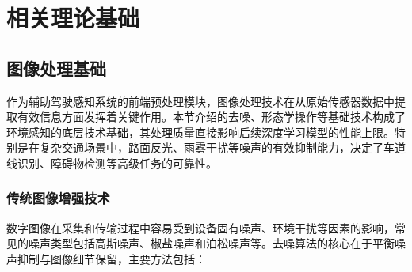\documentclass[a4paper, UTF8, fontsize=12pt]{ctexart} %
\numberwithin{equation}{section} %
\begin{document}

\newpage
\section{相关理论基础}
\renewcommand{\thefigure}{\thesection-\arabic{figure}}
\renewcommand{\thetable}{\thesection-\arabic{table}}
\renewcommand{\figurename}{图}
\setcounter{figure}{0} %
\setcounter{equation}{0} %

\subsection{图像处理基础}

作为辅助驾驶感知系统的前端预处理模块，图像处理技术在从原始传感器数据中提取有效信息方面发挥着关键作用。本节介绍的去噪、形态学操作等基础技术构成了环境感知的底层技术基础，其处理质量直接影响后续深度学习模型的性能上限。特别是在复杂交通场景中，路面反光、雨雾干扰等噪声的有效抑制能力，决定了车道线识别、障碍物检测等高级任务的可靠性。

\subsubsection{传统图像增强技术}


数字图像在采集和传输过程中容易受到设备固有噪声、环境干扰等因素的影响，常见的噪声类型包括高斯噪声、椒盐噪声和泊松噪声等。去噪算法的核心在于平衡噪声抑制与图像细节保留，主要方法包括：
\end{document}
